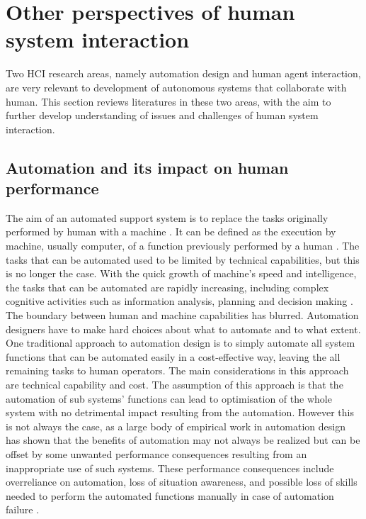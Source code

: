 


\section{Other perspectives of human system interaction}
Two \ac{HCI} research areas, namely automation design and human agent interaction, are very relevant to development of autonomous systems that collaborate with human. This section reviews literatures in these two areas, with the aim to further develop understanding of issues and challenges of human system interaction. \\


\subsection{Automation and its impact on human performance}
The aim of an automated support system is to replace the tasks originally performed by human with a machine \citep{Bradshaw2011}. It can be defined as the execution by machine, usually computer, of a function previously performed by a human \citep{Parasuraman1997}. The tasks that can be automated used to be limited by technical capabilities, but this is no longer the case. With the quick growth of machine's speed and intelligence, the tasks that can be automated are rapidly increasing, including complex cognitive activities such as information analysis, planning and decision making \citep{Parasuraman2000}. The boundary between human and machine capabilities has blurred. Automation designers have to make hard choices about what to automate and to what extent.\\

One traditional approach to automation design is to simply automate all system functions that can be automated easily in a cost-effective way, leaving the all remaining tasks to human operators. The main considerations in this approach are technical capability and cost. The assumption of this approach is that the automation of sub systems' functions can lead to optimisation of the whole system with no detrimental impact resulting from the automation. However this is not always the case, as a large body of empirical work in automation design \citep{Manzey2012,Parasuraman2000} has shown that the benefits of automation may not always be realized but can be offset by some unwanted performance consequences resulting from an inappropriate use of such systems. These performance consequences include overreliance on automation, loss of situation awareness, and possible loss of skills needed to perform the automated functions manually in case of automation failure \citep{Kaber1997}.\\ 

